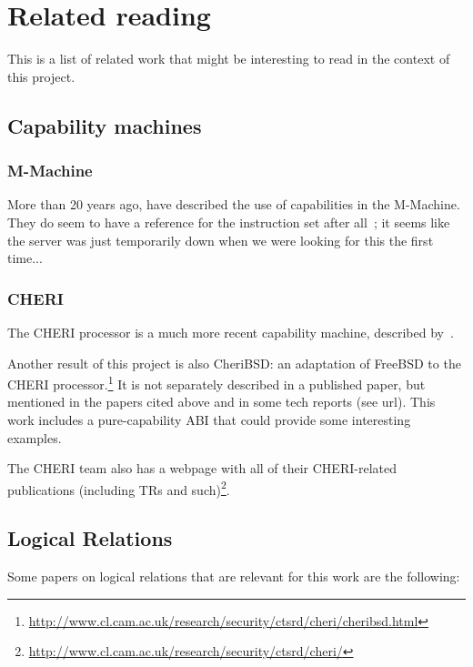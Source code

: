 \documentclass{article}
\begin{document}
\section{Related reading}
\label{sec:related-reading}

This is a list of related work that might be interesting to read in the context
of this project.

\subsection{Capability machines}
\label{sec:rw-cap-machines}

\subsubsection{M-Machine}
More than 20 years ago, \cite{Carter:1994:HSF:195473.195579} have described the
use of capabilities in the M-Machine. They do seem to have a reference for the
instruction set after all~\citep{Dally1997Memo59}; it seems like the server was
just temporarily down when we were looking for this the first time...

\subsubsection{CHERI}

The CHERI processor is a much more recent capability machine, described
by~\cite{Woodruff:2014:CCM:2665671.2665740,Watson2015Cheri}.

Another result of this project is also CheriBSD: an adaptation of FreeBSD to the
CHERI
processor.\footnote{\url{http://www.cl.cam.ac.uk/research/security/ctsrd/cheri/cheribsd.html}}
It is not separately described in a published paper, but mentioned in the papers
cited above and in some tech reports (see url). This work includes a
pure-capability ABI that could provide some interesting examples.

The CHERI team also has a webpage with all of their CHERI-related publications
(including TRs and
such)\footnote{\url{http://www.cl.cam.ac.uk/research/security/ctsrd/cheri/}}.

\subsection{Logical Relations}
\label{sec:rw-log-rel}

Some papers on logical relations that are relevant for this work are the
following:
\end{document}
